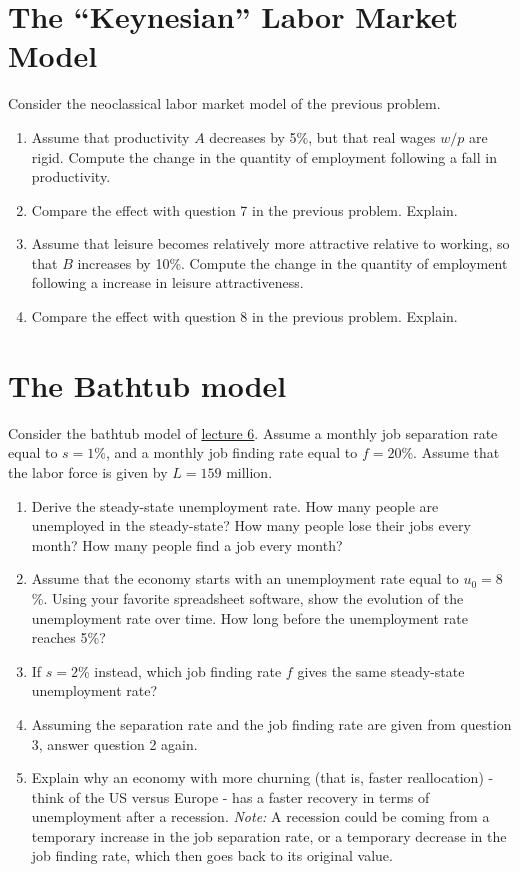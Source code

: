 \documentclass[]{book}
\theoremstyle{definition}
\theoremstyle{definition}
\theoremstyle{definition}
\theoremstyle{remark}
\begin{document}
\section{\texorpdfstring{The ``Keynesian'' Labor Market
Model}{The Keynesian Labor Market Model}}\label{the-keynesian-labor-market-model}

Consider the neoclassical labor market model of the previous problem.

\begin{enumerate}
\def\labelenumi{\arabic{enumi}.}
\item
  Assume that productivity \(A\) decreases by 5\%, but that real wages
  \(w/p\) are rigid. Compute the change in the quantity of employment
  following a fall in productivity.
\item
  Compare the effect with question 7 in the previous problem. Explain.
\item
  Assume that leisure becomes relatively more attractive relative to
  working, so that \(B\) increases by 10\%. Compute the change in the
  quantity of employment following a increase in leisure attractiveness.
\item
  Compare the effect with question 8 in the previous problem. Explain.
\end{enumerate}

\section{The Bathtub model}\label{the-bathtub-model}

Consider the bathtub model of \protect\hyperlink{labor-market}{lecture
6}. Assume a monthly job separation rate equal to \(s=1\)\%, and a
monthly job finding rate equal to \(f=20\)\%. Assume that the labor
force is given by \(L=159\) million.

\begin{enumerate}
\def\labelenumi{\arabic{enumi}.}
\item
  Derive the steady-state unemployment rate. How many people are
  unemployed in the steady-state? How many people lose their jobs every
  month? How many people find a job every month?
\item
  Assume that the economy starts with an unemployment rate equal to
  \(u_0=8\)\%. Using your favorite spreadsheet software, show the
  evolution of the unemployment rate over time. How long before the
  unemployment rate reaches 5\%?
\item
  If \(s=2\)\% instead, which job finding rate \(f\) gives the same
  steady-state unemployment rate?
\item
  Assuming the separation rate and the job finding rate are given from
  question 3, answer question 2 again.
\item
  Explain why an economy with more churning (that is, faster
  reallocation) - think of the US versus Europe - has a faster recovery
  in terms of unemployment after a recession. \emph{Note:} A recession
  could be coming from a temporary increase in the job separation rate,
  or a temporary decrease in the job finding rate, which then goes back
  to its original value.
\end{enumerate}
\end{document}
